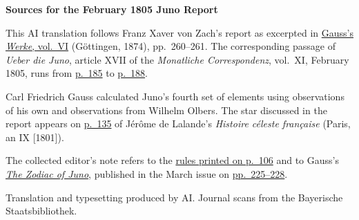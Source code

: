 \clearpage\thispagestyle{empty}
\begin{center}\textbf{Sources for the February 1805 Juno Report}\end{center}
\noindent This AI translation follows Franz Xaver von Zach’s report as excerpted in \href{https://gdz.sub.uni-goettingen.de/id/PPN236007467}{Gauss’s \textit{Werke}, vol.~VI} (Göttingen, 1874), pp.~260--261. The corresponding passage of \textit{Ueber die Juno}, article XVII of the \textit{Monatliche Correspondenz}, vol.~XI, February 1805, runs from \href{https://www.digitale-sammlungen.de/en/view/bsb10538603?page=195}{p.~185} to \href{https://www.digitale-sammlungen.de/en/view/bsb10538603?page=198}{p.~188}.
\par\smallskip\noindent Carl Friedrich Gauss calculated Juno’s fourth set of elements using observations of his own and observations from Wilhelm Olbers. The star discussed in the report appears on \href{https://archive.org/download/histoireclestef00lalagoog/page/n162.jpg}{p.~135} of Jérôme de Lalande’s \textit{Histoire céleste française} (Paris, an IX [1801]).
\par\smallskip\noindent The collected editor’s note refers to the \hyperlink{native-111}{rules printed on p.~106} and to Gauss’s \hyperlink{native-124}{\textit{The Zodiac of Juno}}, published in the March issue on \href{https://www.digitale-sammlungen.de/en/view/bsb10538603?page=237}{pp.~225--228}.
\par\smallskip\noindent Translation and typesetting produced by AI. Journal scans from the Bayerische Staatsbibliothek.
\clearpage
